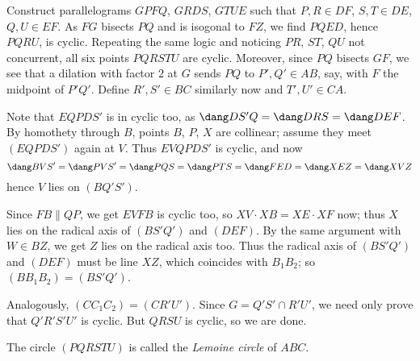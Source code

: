 Construct parallelograms $GPFQ$, $GRDS$, $GTUE$
such that $P,R \in DF$, $S,T \in DE$, $Q,U \in EF$.
As $FG$ bisects $PQ$ and is isogonal to $FZ$,
we find $PQED$, hence $PQRU$, is cyclic.
Repeating the same logic and noticing $PR$, $ST$, $QU$ not concurrent,
all six points $PQRSTU$ are cyclic.
Moreover, since $PQ$ bisects $GF$, we see that
a dilation with factor $2$ at $G$ sends $PQ$ to $P', Q' \in AB$, say,
with $F$ the midpoint of $P'Q'$.
Define $R', S' \in BC$ similarly now and $T', U' \in CA$.

Note that $EQPDS'$ is in cyclic too,
as $\dang DS'Q = \dang DRS = \dang DEF$.
By homothety through $B$, points $B$, $P$, $X$ are collinear;
assume they meet $(EQPDS')$ again at $V$.
Thus $EVQPDS'$ is cyclic, and now
\[ \dang BVS' = \dang PVS' = \dang PQS = \dang PTS = \dang FED = \dang XEZ = \dang XVZ \]
hence $V$ lies on $(BQ'S')$.

Since $FB \parallel QP$, we get $EVFB$ is cyclic too,
so $XV \cdot XB = XE \cdot XF$ now;
thus $X$ lies on the radical axis of $(BS'Q')$ and $(DEF)$.
By the same argument with $W \in BZ$, we get $Z$ lies on the radical axis too.
Thus the radical axis of $(BS'Q')$ and $(DEF)$ must be line $XZ$,
which coincides with $B_1B_2$; so $(BB_1B_2) = (BS'Q')$.

Analogously, $(CC_1C_2) = (CR'U')$.
Since $G = Q'S' \cap R'U'$, we need only prove that $Q'R'S'U'$ is cyclic.
But $QRSU$ is cyclic, so we are done.

The circle $(PQRSTU)$ is called the \emph{Lemoine circle} of $ABC$.
